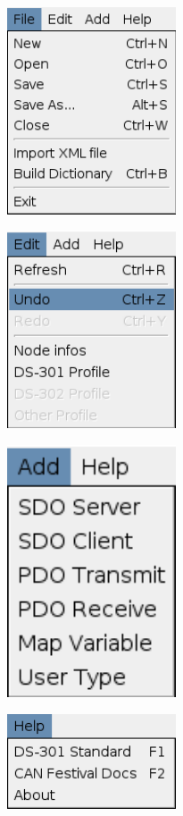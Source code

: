 \documentclass[12pt,twoside]{article}
\begin{document}
 \begin{center}
   \includegraphics[width=5cm]{Pictures/10000000000000B6000000DF1EDD1E73.png}
\end{center}
  \begin{center}
   \includegraphics[width=5cm]{Pictures/10000000000000AC000000C9C3F53FA6.png}
\end{center}
 \begin{center}
   \includegraphics[width=5cm]{Pictures/100000000000006D000000A31EC8CB54.png}
\end{center}
  \begin{center}
   \includegraphics[width=5cm]{Pictures/10000000000000AA0000006014F74635.png}
\end{center}
\end{document}
